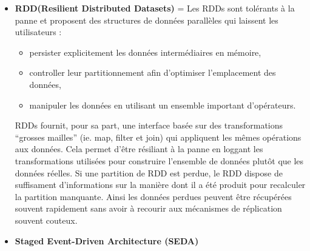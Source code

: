 \documentclass[french]{article}
\begin{document}
\begin{itemize}[label=\textbullet, font=\LARGE \color{orange}]
	\item \textbf{RDD(Resilient Distributed Datasets)} =  Les RDDs sont tolérants à la panne et proposent des structures de données parallèles qui laissent les utilisateurs :
		\begin{itemize}
    		\item persister explicitement les données intermédiaires en mémoire,
    		\item controller leur partitionnement afin d’optimiser l’emplacement des données,
    		\item manipuler les données en utilisant un ensemble important d’opérateurs.
		\end{itemize}
		RDDs fournit, pour sa part, une interface basée sur des transformations “grosses mailles” (ie. map, filter et join) qui appliquent les mêmes opérations aux données. Cela permet d’être résiliant à la panne en loggant les transformations utilisées pour construire l’ensemble de données plutôt que les données réelles. Si une partition de RDD est perdue, le RDD dispose de suffisament d’informations sur la manière dont il a été produit pour recalculer la partition manquante. Ainsi les données perdues peuvent être récupérées souvent rapidement sans avoir à recourir aux mécanismes de réplication souvent couteux.
\item \textbf{Staged Event-Driven Architecture (SEDA)} 		
\end{itemize}
\end{document}
